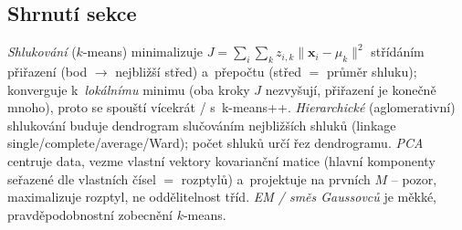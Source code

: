 \subsection*{Shrnutí sekce}

\emph{Shlukování} ($k$-means) minimalizuje $J=\sum_i\sum_k z_{i,k}\|\mathbf{x}_i-\mu_k\|^2$ střídáním přiřazení (bod $\to$ nejbližší střed) a~přepočtu (střed $=$ průměr shluku); konverguje k~\emph{lokálnímu} minimu (oba kroky $J$ nezvyšují, přiřazení je konečně mnoho), proto se spouští vícekrát / s~k-means++. \emph{Hierarchické} (aglomerativní) shlukování buduje dendrogram slučováním nejbližších shluků (linkage single/complete/average/Ward); počet shluků určí řez dendrogramu. \emph{PCA} centruje data, vezme vlastní vektory kovarianční matice (hlavní komponenty seřazené dle vlastních čísel $=$ rozptylů) a~projektuje na prvních $M$ -- pozor, maximalizuje rozptyl, ne oddělitelnost tříd. \emph{EM / směs Gaussovců} je měkké, pravděpodobnostní zobecnění $k$-means.
